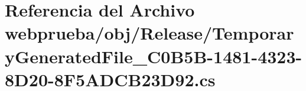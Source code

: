 \hypertarget{webprueba_2obj_2_release_2_temporary_generated_file__036_c0_b5_b-1481-4323-8_d20-8_f5_a_d_c_b23_d92_8cs}{}\section{Referencia del Archivo webprueba/obj/\+Release/\+Temporary\+Generated\+File\+\_\+C0\+B5\+B-\/1481-\/4323-\/8\+D20-\/8\+F5\+A\+D\+C\+B23\+D92.cs}
\label{webprueba_2obj_2_release_2_temporary_generated_file__036_c0_b5_b-1481-4323-8_d20-8_f5_a_d_c_b23_d92_8cs}
